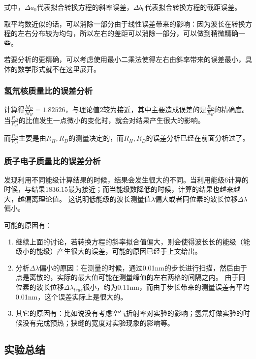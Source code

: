 \documentclass[a4paper,UTF8]{ctexart}
\begin{document}
式中，$\Delta a_0$代表拟合转换方程的斜率误差，$\Delta b_0$代表拟合转换方程的截距误差。

取平均数近似的话，可以消除一部分由于线性误差带来的影响：因为波长在转换方程的左右分布较为均匀，所以左右的差距可以消除一部分，可以做到稍微精确一些。

若要分析的更精确，可以考虑使用最小二乘法使得左右由斜率带来的误差最小，具体的数学形式就不在这里展开。

\subsubsection{氢氘核质量比的误差分析}

计算得$\frac{M_{D}}{M_{H}} = 1.82526$，与理论值$2$较为接近，其中主要造成误差的是$\frac{R_D}{R_H}$的精确度。
当$\frac{R_D}{R_H}$的比值发生一点微小的变化时，就会对结果产生很大的影响。

而$\frac{R_D}{R_H}$主要是由$R_{H},R_{D}$的测量决定的，而$R_{H},R_{D}$的误差分析已经在前面分析过了。

\subsubsection{质子电子质量比的误差分析}

发现利用不同能级计算结果的时候，结果会发生很大的不同。当利用能级6计算的时候，与结果1836.15最为接近；而当能级数降低的时候，计算的结果也越来越大，越偏离理论值。
这说明低能级的波长测量值$\lambda$偏大或者同位素的波长位移$\Delta \lambda$偏小。

可能的原因有：

\begin{enumerate}
    \item 继续上面的讨论，若转换方程的斜率拟合值偏大，则会使得波长长的能级（能级小的能级）产生很大的误差，可能的原因已经于上文给出。
    \item 分析$\Delta \lambda$偏小的原因：在测量的时候，通过0.01nm的步长进行扫描，然后由于点是离散的，实际的最大值可能在测量峰值的左右两格的间隔之内。
    由于同位素的波长位移$\Delta \lambda_{true}$很小，约为0.11nm，而由于步长带来的测量误差有平均0.01nm，这个误差实际上是很大的。
    \item 其它的原因有：比如说没有考虑空气折射率对实验的影响；氢氘灯做实验的时候没有完成预热；狭缝的宽度对实验现象的影响等。
\end{enumerate}

\subsection{实验总结}
\end{document}
